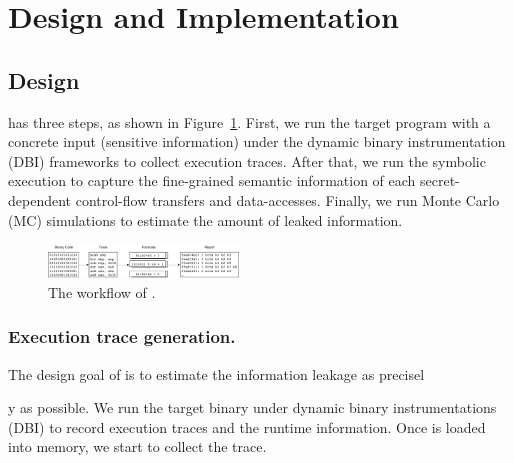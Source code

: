\section{Design and Implementation}

\subsection{Design}
\tool{} has three steps,
as shown in Figure~\ref{fig:workflow}. First, we run the target program with a
concrete input (sensitive information) under the dynamic binary instrumentation
(DBI) frameworks to collect execution traces. After that, we run the symbolic
execution to capture the fine-grained semantic information of each
secret-dependent control-flow transfers and data-accesses. Finally, we run Monte
Carlo (MC) simulations to estimate the amount of leaked information.

\begin{figure}[t]
    \centering
    \includegraphics[width=0.45\textwidth]{./figures/workflow.pdf}
    \caption{The workflow of \tool{}.}
    \label{fig:workflow}
    \vspace*{-15pt}
\end{figure}

\subsubsection{Execution trace generation.} The design goal of \tool{} is to estimate the information leakage as precisel

y as possible. 
We run the target binary under dynamic binary instrumentations (DBI)
to record execution traces and the runtime information.
Once  is loaded into memory, we start to collect the trace. 
